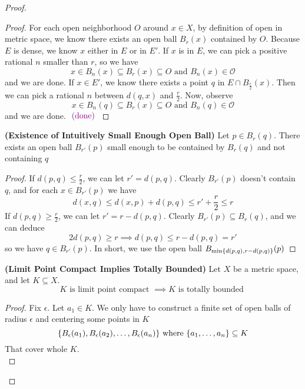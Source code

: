 \documentclass{report}
\begin{document}
\begin{proof}
\begin{proof}
For each open neighborhood $O$ around  $x\in X$, by definition of open in metric space, we know there exists an open ball $B_r(x)$ contained by $O$. Because $E$ is dense, we know  $x$ either in $E$ or in  $E'$. If $x$ is in  $E$, we can pick a positive rational  $n$ smaller than  $r$, so we have  
\begin{equation}
x\in B_n(x)\subseteq B_r(x)\subseteq O\text{ and }B_n(x)\in \mathcal{O} 
\end{equation}
and we are done. If $x\in E'$, we know there exists a point $q$ in  $E\cap B_{\frac{r}{2}}(x)$. Then we can pick a rational $n$ between $d(q,x)$ and $\frac{r}{2}$. Now, observe
\begin{equation}
x\in B_n(q)\subseteq B_r(x)\subseteq O\text{ and }B_n(q)\in \mathcal{O}
\end{equation}
and we are done. $\textcolor{violet}{\text{ (done) }}$
\end{proof}
\begin{lemma}
\label{3.5.2}
\textbf{(Existence of Intuitively Small Enough Open Ball)} Let $p\in  B_r(q)$. There exists an open ball $B_{r'}(p)$ small enough to be contained by $B_r(q)$ and not containing $q$ 
\end{lemma}
\begin{proof}
If $d(p,q)\leq \frac{r}{2}$, we can let $r'=d(p,q)$. Clearly $B_{r'}(p)$ doesn't contain $q$, and for each  $x\in B_{r'}(p)$ we have
\begin{equation}
d(x,q)\leq d(x,p)+d(p,q)\leq r'+\frac{r}{2}\leq r
\end{equation}
If $d(p,q)\geq \frac{r}{2}$, we can let $r'=r-d(p,q)$. Clearly $B_{r'}(p)\subseteq B_r(q)$, and we can deduce
\begin{equation}
2d(p,q)\geq r\implies d(p,q)\leq r-d(p,q)=r'
\end{equation}
so we have $q\in B_{r'}(p)$. In short, we use the open ball  $B_{\min \{ d(p,q),r-d(p,q) \}}(p)$
\end{proof}
\begin{theorem}
\label{3.5.3}
\textbf{(Limit Point Compact Implies Totally Bounded)} Let $X$ be a metric space, and let $K\subseteq X$.
\begin{equation}
K\text{ is limit point compact }\implies K\text{ is totally bounded }
\end{equation}
\end{theorem}
\begin{proof}
Fix $\epsilon $. Let $a_1\in K$. We only have to construct a finite set of open balls of radius $\epsilon $ and centering some points in $K$
\begin{equation}
\{ B_{\epsilon}(a_1),B_{\epsilon }(a_2),\dots ,B_{\epsilon }(a_n) \}\text{ where }\{ a_1,\dots ,a_n \}\subseteq K
\end{equation}
That cover whole $K$.\\


\end{proof}
\end{proof}
\end{document}
